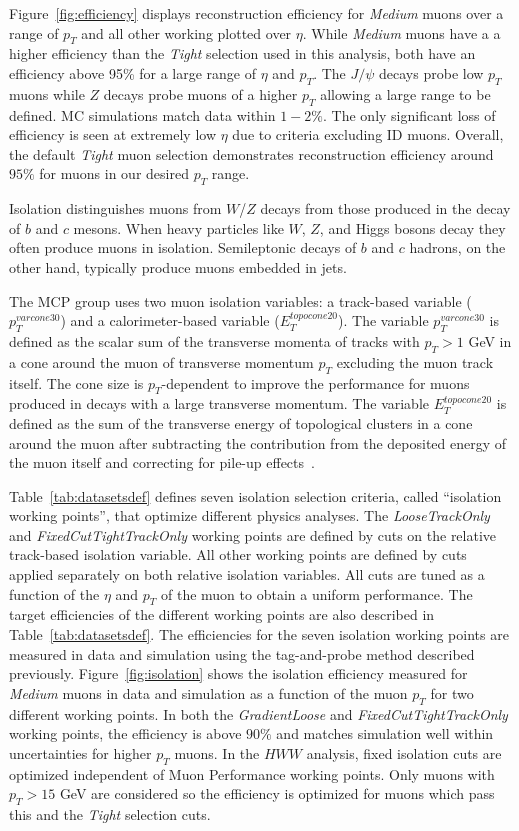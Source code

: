 Figure~\ref{fig:efficiency} displays reconstruction efficiency for \textit{Medium} muons over a range of $p_T$ and all other working plotted over $\eta$. While \textit{Medium} muons have a a higher efficiency than the \textit{Tight} selection used in this analysis, both have an efficiency above 95\% for a large range of $\eta$ and $p_T$. The $J/\psi$ decays probe low $p_T$ muons while $Z$ decays probe muons of a higher $p_T$ allowing a large range to be defined. MC simulations match data within $1-2\%$. The only significant loss of efficiency is seen at extremely low $\eta$ due to criteria excluding ID muons. Overall, the default \textit{Tight} muon selection demonstrates reconstruction efficiency around $95\%$ for muons in our desired $p_T$ range.

Isolation distinguishes muons from $W$/$Z$ decays from those produced in the decay of $b$ and $c$ mesons. When heavy particles like $W$, $Z$, and Higgs bosons decay they often produce muons in isolation. Semileptonic decays of $b$ and $c$ hadrons, on the other hand, typically produce muons embedded in jets.

The MCP group uses two muon isolation variables: a track-based variable ($p_T^{varcone30}$) and a calorimeter-based variable ($E_T^{topocone20}$). The variable $p_T^{varcone30}$ is defined as the scalar sum of the transverse momenta of tracks with $p_T > 1$ GeV in a cone around the muon of transverse momentum $p_T$ excluding the muon track itself. The cone size is $p_T$-dependent to improve the performance for muons produced in decays with a large transverse momentum. The variable $E_T^{topocone20}$ is defined as the sum of the transverse energy of topological clusters in a cone around the muon after subtracting the contribution from the deposited energy of the muon itself and correcting for pile-up effects~\cite{jets}. 

Table~\ref{tab:datasetsdef} defines seven isolation selection criteria, called ``isolation working points'', that optimize different physics analyses. The \textit{LooseTrackOnly} and \textit{FixedCutTightTrackOnly} working points are defined by cuts on the relative track-based isolation variable. All other working points are defined by cuts applied separately on both relative isolation variables. All cuts are tuned as a function of the $\eta$ and $p_T$ of the muon to obtain a uniform performance. The target efficiencies of the different working points are also described in Table~\ref{tab:datasetsdef}. The efficiencies for the seven isolation working points are measured in data and simulation using the tag-and-probe method described previously. Figure~\ref{fig:isolation} shows the isolation efficiency measured for \textit{Medium} muons in data and simulation as a function of the muon $p_T$ for two different working points. In both the \textit{GradientLoose} and \textit{FixedCutTightTrackOnly} working points, the efficiency is above $90\%$ and matches simulation well within uncertainties for higher $p_T$ muons. In the $HWW$ analysis, fixed isolation cuts are optimized independent of Muon Performance working points. Only muons with $p_T>15$ GeV are considered so the efficiency is optimized for muons which pass this and the \textit{Tight} selection cuts.  

